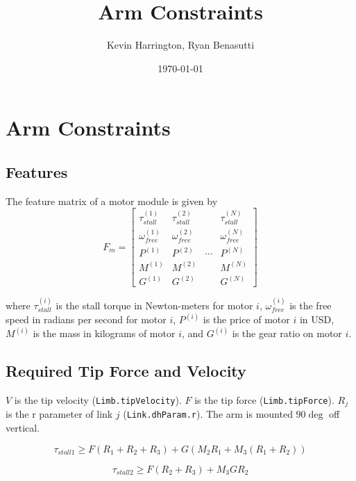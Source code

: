 \documentclass{article}
\title{Arm Constraints}
\author{Kevin Harrington, Ryan Benasutti}
\date{\today}
\begin{document}
\maketitle

\FloatBarrier
\section{Arm Constraints}

\FloatBarrier
\subsection{Features}

The feature matrix of a motor module is given by
\begin{equation}
    F_m =
    \begin{bmatrix}
        \tau_{stall}^{(1)} & \tau_{stall}^{(2)} & & \tau_{stall}^{(N)} \\[6pt]
        \omega_{free}^{(1)} & \omega_{free}^{(2)} & & \omega_{free}^{(N)} \\[6pt]
        P^{(1)} & P^{(2)} & \cdots & P^{(N)} \\[6pt]
        M^{(1)} & M^{(2)} & & M^{(N)} \\[6pt]
        G^{(1)} & G^{(2)} & & G^{(N)}
    \end{bmatrix}
\end{equation}

where $\tau_{stall}^{(i)}$ is the stall torque in Newton-meters for motor $i$,
$\omega_{free}^{(i)}$ is the free speed in radians per second for motor $i$,
$P^{(i)}$ is the price of motor $i$ in USD, $M^{(i)}$ is the mass in kilograms
of motor $i$, and $G^{(i)}$ is the gear ratio on motor $i$.

\FloatBarrier
\subsection{Required Tip Force and Velocity}

$V$ is the tip velocity (\texttt{Limb.tipVelocity}). $F$ is the tip force
(\texttt{Limb.tipForce}). $R_j$ is the r parameter of link $j$
(\texttt{Link.dhParam.r}). The arm is mounted $90 \deg$ off vertical.

\begin{equation}
    \tau_{stall 1} \geq F(R_1 + R_2 + R_3) + G(M_2 R_1 + M_3 (R_1 + R_2))
\end{equation}

\begin{equation}
    \tau_{stall 2} \geq F(R_2 + R_3) + M_3 G R_2
\end{equation}
\end{document}
